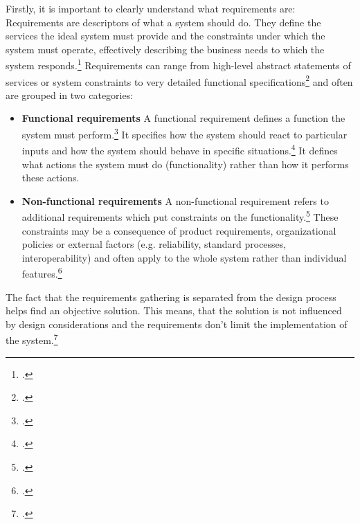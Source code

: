 Firstly, it is important to clearly understand what requirements are: Requirements are descriptors of what a system should do. They define the services the ideal system must provide and the constraints under which the system must operate, effectively describing the business needs to which the system responds.\footcites[Cf.][p.100]{SommervilleSoftwareengineering2011}[cf.][p.95]{IEEEIEEEstandardglossary1990} Requirements can range from high-level abstract statements of services or system constraints to very detailed functional specifications\footcite[Cf.][p.215]{DavisSoftwarerequirementsobjects1993} and often are grouped in two categories: 
\begin{itemize}
    \item \textbf{Functional requirements} A functional requirement defines a function the system must perform.\footcite[Cf.][p.34]{IEEEIEEEstandardglossary1990} It specifies how the system should react to particular inputs and how the system should behave in specific situations.\footcite[Cf.][p.102]{SommervilleSoftwareengineering2011} It defines what actions the system must do (functionality) rather than how it performs these actions. 
    \item \textbf{Non-functional requirements} A non-functional requirement refers to additional requirements which put constraints on the functionality.\footcite[Cf.][p.102]{SommervilleSoftwareengineering2011} These constraints may be a consequence of product requirements, organizational policies or external factors (e.g. reliability, standard processes, interoperability) and often apply to the whole system rather than individual features.\footcite[Cf.][p.102]{SommervilleSoftwareengineering2011}
\end{itemize}

The fact that the requirements gathering is separated from the design process helps find an objective solution. This means, that the solution is not influenced by design considerations and the requirements don't limit the implementation of the system.\footcite[Cf.][p.18]{SommervilleIntegratedrequirementsengineering2005}

